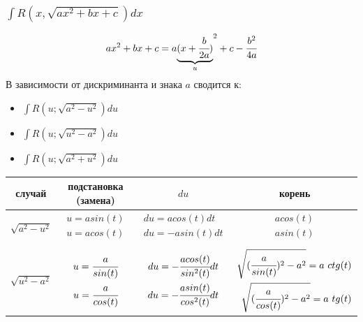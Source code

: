 \documentclass[a4paper]{article}
\theoremstyle{definition}
\numberwithin{theorem}{subsection}
\numberwithin{lemma}{subsection}
\numberwithin{definition}{subsection}
\numberwithin{comment*}{subsection}
\numberwithin{consequence}{subsection}
\numberwithin{property}{subsection}
\begin{document}
\subsubsection{\texorpdfstring{$\int R(x, \sqrt{ax^2+bx+c}) dx$}{(***)} }
$$ax^2 +bx +c = a {\underbrace{(x+\cfrac{b}{2a})}_{u}}^2 + c - \cfrac{b^2}{4a}$$
В зависимости от дискриминанта и знака $a$ сводится к:
\begin{itemize}
 \item $\int R(u; \sqrt{a^2-u^2}) du$
 \item $\int R(u; \sqrt{u^2-a^2}) du$
 \item $\int R(u; \sqrt{a^2+u^2}) du$
\end{itemize}
\begin{center}
 \begin{tabular}{ c c c c }
  \hline
  случай           & подстановка (замена)          & $du$                          & корень                        \\
  \hline
  $\sqrt{a^2-u^2}$ & $\begin{aligned}
    u = asin(t) \\
    u = acos(t) \\
   \end{aligned}$ & $\begin{aligned}
    du = acos(t) dt  \\
    du = -asin(t) dt \\
   \end{aligned}$ & $\begin{aligned}
    acos(t) \\
    asin(t) \\
   \end{aligned}$ \\
  \hline
  $\sqrt{u^2-a^2}$ & $\begin{aligned}
    u = \cfrac{a}{sin(t)} \\
    u = \cfrac{a}{cos(t)} \\
   \end{aligned}$ & $\begin{aligned}
    du = -\cfrac{acos(t)}{sin^2 (t)} dt \\
    du = -\cfrac{asin(t)}{cos^2 (t)} dt \\
   \end{aligned}$ & $\begin{aligned}
    \sqrt{(\cfrac{a}{sin(t)})^2 - a^2}=a\ ctg(t) \\
    \sqrt{(\cfrac{a}{cos(t)})^2 - a^2}=a\ tg(t)  \\
   \end{aligned}$ \\

\end{tabular}
\end{center}
\end{document}
